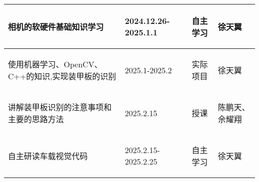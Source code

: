 \begin{longtable}{ p{6cm} | p{3cm} | p{1.5cm} | p{4.3cm} |}
       \begin{center}
           相机的软硬件基础知识学习
       \end{center} &
       \begin{center}
           2024.12.26-2025.1.1
       \end{center} &
       \begin{center}
           自主学习
       \end{center} &
       \begin{center}
           徐天翼
       \end{center} \\
        
    \hline
    
        \begin{center}
            使用机器学习、OpenCV、C++的知识,实现装甲板的识别
        \end{center}&
        \begin{center}
            2025.1-2025.2
        \end{center}&
        \begin{center}
            实际项目
        \end{center}&
        \begin{center}
            徐天翼
        \end{center}\\

    \hline

        \begin{center}
            讲解装甲板识别的注意事项和主要的思路方法
        \end{center}&
        \begin{center}
            2025.2.15
        \end{center}&
        \begin{center}
            授课
        \end{center}&
        \begin{center}
            陈鹏天、佘耀翔
        \end{center}\\

    \hline

        \begin{center}
            自主研读车载视觉代码
        \end{center}&
        \begin{center}
            2025.2.15-2025.2.25
        \end{center}&
        \begin{center}
            自主学习
        \end{center}&
        \begin{center}
            徐天翼
        \end{center}\\


\end{longtable}
